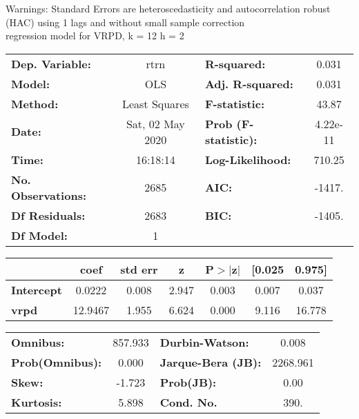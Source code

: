 Warnings: \newline
 [1] Standard Errors are heteroscedasticity and autocorrelation robust (HAC) using 1 lags and without small sample correction\\ 

regression model for VRPD, k = 12 h = 2\begin{center}
\begin{tabular}{lclc}
\toprule
\textbf{Dep. Variable:}    &       rtrn       & \textbf{  R-squared:         } &     0.031   \\
\textbf{Model:}            &       OLS        & \textbf{  Adj. R-squared:    } &     0.031   \\
\textbf{Method:}           &  Least Squares   & \textbf{  F-statistic:       } &     43.87   \\
\textbf{Date:}             & Sat, 02 May 2020 & \textbf{  Prob (F-statistic):} &  4.22e-11   \\
\textbf{Time:}             &     16:18:14     & \textbf{  Log-Likelihood:    } &    710.25   \\
\textbf{No. Observations:} &        2685      & \textbf{  AIC:               } &    -1417.   \\
\textbf{Df Residuals:}     &        2683      & \textbf{  BIC:               } &    -1405.   \\
\textbf{Df Model:}         &           1      & \textbf{                     } &             \\
\bottomrule
\end{tabular}
\begin{tabular}{lcccccc}
                   & \textbf{coef} & \textbf{std err} & \textbf{z} & \textbf{P$> |$z$|$} & \textbf{[0.025} & \textbf{0.975]}  \\
\midrule
\textbf{Intercept} &       0.0222  &        0.008     &     2.947  &         0.003        &        0.007    &        0.037     \\
\textbf{vrpd}      &      12.9467  &        1.955     &     6.624  &         0.000        &        9.116    &       16.778     \\
\bottomrule
\end{tabular}
\begin{tabular}{lclc}
\textbf{Omnibus:}       & 857.933 & \textbf{  Durbin-Watson:     } &    0.008  \\
\textbf{Prob(Omnibus):} &   0.000 & \textbf{  Jarque-Bera (JB):  } & 2268.961  \\
\textbf{Skew:}          &  -1.723 & \textbf{  Prob(JB):          } &     0.00  \\
\textbf{Kurtosis:}      &   5.898 & \textbf{  Cond. No.          } &     390.  \\
\bottomrule
\end{tabular}
\end{center}

